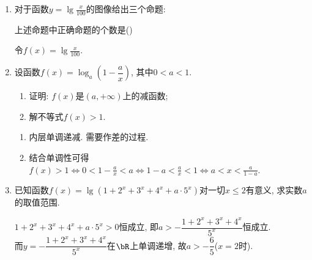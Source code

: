 \begin{enumerate}
\item 对于函数$y=\lg\frac{x}{100}$的图像给出三个命题: 
上述命题中正确命题的个数是\dotfill()
\begin{jieda}
令$f(x)=\lg\frac{x}{100}$. 
\end{jieda}


\item 设函数$f(x)=\log_a\left(1-\dfrac{a}{x}\right)$, 其中$0<a<1$. 
\begin{enumerate}[(1)]
\item 证明: $f(x)$是$(a,+\infty)$上的减函数; 
\item 解不等式$f(x)>1$.
\end{enumerate}
\begin{jieda}
\begin{enumerate}[(1)]
\item 内层单调递减. 需要作差的过程. 
\item 结合单调性可得$f(x)>1\iff 0<1-\frac{a}{x}<a\iff 1-a<\frac{a}{x}<1\iff a<x<\frac{a}{1-a}$. 
\end{enumerate}
\end{jieda}



\item 已知函数$f(x)=\lg(1+2^x+3^x+4^x+a\cdot5^x)$对一切$x\leq 2$有意义, 求实数$a$的取值范围. 
\begin{jieda}
$1+2^x+3^x+4^x+a\cdot5^x>0$恒成立, 即$a>-\dfrac{1+2^x+3^x+4^x}{5^x}$恒成立. \\
而$y=-\dfrac{1+2^x+3^x+4^x}{5^x}$在$\bR$上单调递增, 故$a>-\dfrac{6}{5}$($x=2$时). 
\end{jieda}




\end{enumerate}
